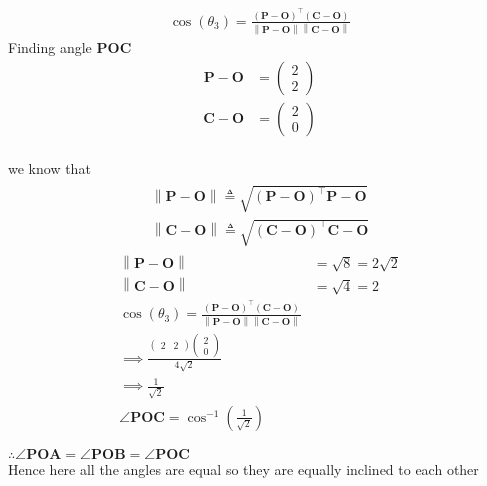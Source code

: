 \documentclass[12pt,-letter paper]{article}
\let\vec\mathbf{}
\let\vec\mathbf{}
\let\vec\mathbf{}
\providecommand{\brak}[1]{\ensuremath{\left(#1\right)}}
\providecommand{\norm}[1]{\left\lVert#1\right\rVert}
\newcommand{\myvec}[1]{\ensuremath{\begin{pmatrix}#1\end{pmatrix}}}
\begin{document}
\begin{enumerate}
    \begin{align}
	\cos{\brak{\theta_3}} = \frac{(\vec{P}-\vec{O})^\top(\vec{C}-\vec{O})}{\norm{\vec{P}-\vec{O}}\norm{\vec{C}-\vec{O}}}
\end{align}
Finding angle $\vec{POC}$  \\
\begin{align}
	\vec{P}-\vec{O} &=\myvec{2\\2}
\end{align}
\begin{align}
	\vec{C}-\vec{O} &=\myvec{2\\0}
\end{align}
\\we know that 
 \begin{align}
 \begin{split}
     \norm{\vec{P}-\vec{O}} \triangleq \sqrt{\brak{\vec{P}-\vec{O}}^{\top}{\vec{P}-\vec{O}}}\\
     \norm{\vec{C}-\vec{O}} \triangleq \sqrt{\brak{\vec{C}-\vec{O}}^{\top}{\vec{C}-\vec{O}}}
 \end{split}
		\end{align}
\begin{align}
	\norm{\vec{P}-\vec{O}} &= \sqrt{8} = 2\sqrt{2} \\
	\norm{\vec{C}-\vec{O}} &= \sqrt{4} = 2\\
 \cos{\brak{\theta_3}} = \frac{(\vec{P}-\vec{O})^\top(\vec{C}-\vec{O})}{\norm{\vec{P}-\vec{O}}\norm{\vec{C}-\vec{O}}}\\
 \implies \frac{\myvec{2&2}\myvec{2\\0} }{4\sqrt{2}}\\
 \implies \frac{1}{\sqrt{2}}\\
\angle \vec{POC} = \cos^{-1}\brak{{\frac{1}{\sqrt{2}}}}
\end{align}

$\therefore \angle \vec{POA} = \angle \vec{POB} = \angle \vec{POC}$ \\
Hence here all the angles are equal so they are equally inclined to each other
\end{enumerate}
\end{document}

